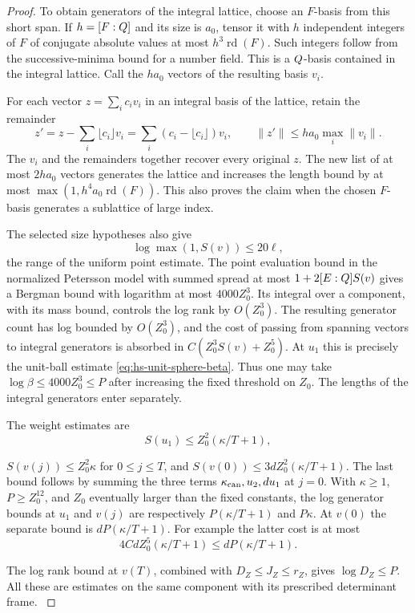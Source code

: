 \begin{proof}
To obtain generators of the integral lattice, choose
an \(F\)-basis from this short span. If \(h=[F:Q]\)
and its size is \(a_0\), tensor it with \(h\) independent
integers of \(F\) of conjugate absolute values at most
\(h^3\operatorname{rd}(F)\). Such integers follow from
the successive-minima bound for a number field.
This is a \(Q\)-basis contained in the integral lattice.
Call the \(ha_0\) vectors of the resulting basis \(v_i\).

For each vector \(z=\sum_i c_iv_i\) in an integral basis of the lattice,
retain the remainder
\[
 z'=z-\sum_i\lfloor c_i\rfloor v_i
   =\sum_i(c_i-\lfloor c_i\rfloor)v_i,\qquad
 \|z'\|\le ha_0\max_i\|v_i\|.
\]
The \(v_i\) and the remainders together recover every original \(z\). The new list of at most \(2ha_0\)
vectors generates the lattice and increases the length
bound by at most \(\max(1,h^4a_0\operatorname{rd}(F))\).
This also proves the claim when the chosen \(F\)-basis
generates a sublattice of large index.

The selected size hypotheses also give
\[
 \log\max(1,S(v))\le20\ell,
\]
the range of the uniform
point estimate. The point evaluation bound in the normalized Petersson
model with summed spread at most
\(1+2[E:Q]S(v)\) gives a Bergman bound with logarithm
at most \(4000Z_0^3\). Its integral over a component,
with its mass bound, controls the log rank by
\(O(Z_0^3)\). The resulting generator count has log
bounded by \(O(Z_0^3)\), and the cost of passing from
spanning vectors to integral generators is absorbed in
\(C(Z_0^3S(v)+Z_0^5)\). At \(u_1\) this is precisely the unit-ball estimate \eqref{eq:hs-unit-sphere-beta}. Thus
one may take \(\log\beta\le4000Z_0^3\le P\) after increasing the fixed
threshold on \(Z_0\). The lengths of the integral generators enter separately.

The weight estimates are
\[
 S(u_1)\le Z_0^2(\kappa/T+1),
\]

\(S(v(j))\le Z_0^2\kappa\) for \(0\le j\le T\), and
\(S(v(0))\le 3d Z_0^2(\kappa/T+1)\).
The last bound follows by summing the three terms
\(\kappa_{\rm can},u_2,d u_1\) at \(j=0\).
With \(\kappa\ge1\), \(P\ge Z_0^{12}\), and \(Z_0\)
eventually larger than the fixed constants,
the log generator bounds at \(u_1\) and \(v(j)\)
are respectively \(P(\kappa/T+1)\) and \(P\kappa\).
At \(v(0)\) the separate bound is \(dP(\kappa/T+1)\).
For example the latter cost is at most
\[
 4Cd Z_0^5(\kappa/T+1)\le dP(\kappa/T+1).
\]

The log rank bound at \(v(T)\), combined with
\(D_Z\le J_Z\le r_Z\), gives \(\log D_Z\le P\).
All these are estimates on the same component with its
prescribed determinant frame. \label{cor:covolume-hilbert-samuel-2}

\end{proof}

